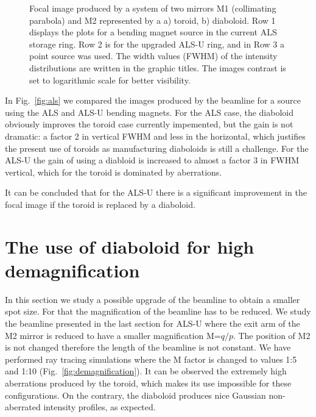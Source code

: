 \documentclass{iucr}              %
\begin{document}
\begin{figure}
% 
\caption{Focal image produced by a system of two mirrors M1 (collimating parabola) and M2 represented by a a) toroid, b) diaboloid. Row 1 displays the plots for a bending magnet source in the current ALS storage ring. Row 2 is for the upgraded ALS-U ring, and in Row 3 a point source was used. The width values (FWHM) of the intensity distributions are written in the graphic titles. The images contrast is set to logarithmic scale for better visibility.
}
\end{figure}

In Fig.~\ref{fig:als} we compared the images produced by the beamline for a source using the ALS and ALS-U bending magnets. For the ALS case, the diaboloid obviously improves the toroid case currently impemented, but the gain is not dramatic: a factor 2 in vertical FWHM and less in the horizontal, which justifies the present use of toroids as manufacturing diaboloids is still a challenge. For the ALS-U the gain of using a diabloid is increased to almost a factor 3 in FWHM vertical, which for the toroid is dominated by aberrations.

It can be concluded that for the ALS-U there is a significant improvement in the focal image if the toroid is replaced by a diaboloid.
 

\section{The use of diaboloid for high demagnification}
\label{sec:scan}

In this section we study a possible upgrade of the beamline to obtain a smaller spot size. For that the magnification of the beamline has to be reduced. We study the beamline presented in the last section for ALS-U where the exit arm of the M2 mirror is reduced to have a smaller magnification M=$q/p$. The position of M2 is not changed therefore the length of the beamline is not constant. We have performed ray tracing simulations where the M factor is changed to values 1:5 and 1:10 (Fig.~\ref{fig:demagnification}). It can be observed the extremely high aberrations produced by the toroid, which makes its use impossible for these configurations. On the contrary, the diaboloid produces nice Gaussian non-aberrated intensity profiles, as expected.
\end{document}
